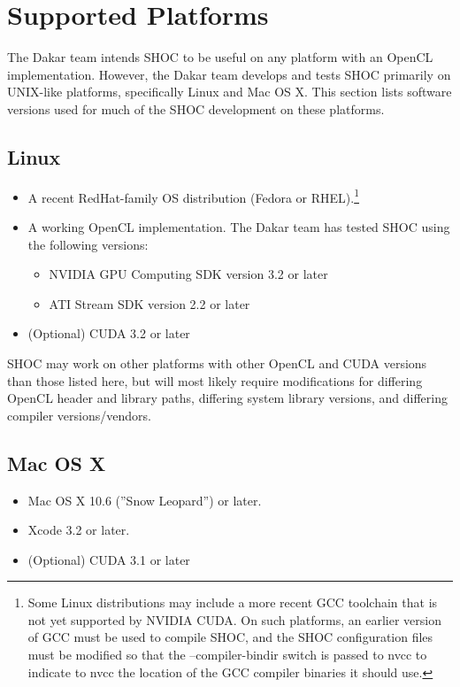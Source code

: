 \documentclass[11pt]{article}
\begin{document}
\section{Supported Platforms}\label{sec:supported}

The Dakar team intends SHOC to be useful on any platform with an
OpenCL implementation. However, the Dakar team develops and tests
SHOC primarily on UNIX-like platforms, specifically Linux and
Mac OS X.
This section lists software versions used for much of the SHOC development
on these platforms.

\subsection{Linux}

\begin{itemize}
\item A recent RedHat-family OS distribution (Fedora or RHEL).\footnote{
Some Linux distributions may include a more recent GCC toolchain that is
not yet supported by NVIDIA CUDA.  On such platforms, an earlier version of GCC
must be used to compile SHOC, and the SHOC configuration files must be
modified so that the --compiler-bindir switch is passed to nvcc to 
indicate to nvcc the location of the GCC compiler binaries it should use.}
\item A working OpenCL implementation. The Dakar team has tested SHOC
using the following versions:
    \begin{itemize}
        \item NVIDIA GPU Computing SDK version 3.2 or later
        \item ATI Stream SDK version 2.2 or later
    \end{itemize}
\item (Optional) CUDA 3.2 or later
\end{itemize}

SHOC may work on other platforms with other OpenCL and CUDA versions
than those listed here, but will most likely require modifications for
differing OpenCL header and library paths, differing system library versions,
and differing compiler versions/vendors.

\subsection{Mac OS X}

\begin{itemize}
\item Mac OS X 10.6 (''Snow Leopard'') or later.
\item Xcode 3.2 or later.
\item (Optional) CUDA 3.1 or later
\end{itemize}
\end{document}
